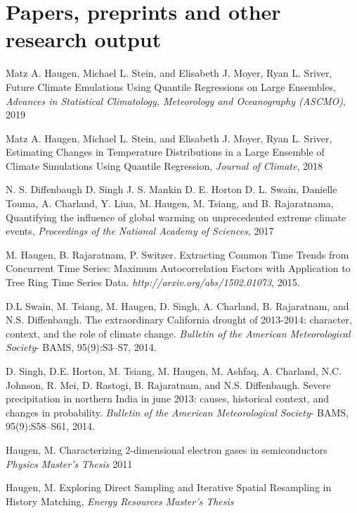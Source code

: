 \documentclass[letterpaper, 12pt]{article}
\renewenvironment{itemize}{
  \begin{list}{}{
    \setlength{\leftmargin}{1.5em}
  }
}{
  \end{list}
}
\begin{document}
\section*{Papers, preprints and other research output}
\begin{itemize}
  \item{Matz A. Haugen, Michael L. Stein, and Elisabeth J. Moyer, Ryan L. Sriver, Future Climate Emulations Using Quantile Regressions on Large Ensembles, \emph{Advances in Statistical Climatology, Meteorology and Oceanography (ASCMO)}, 2019}
  \item{Matz A. Haugen, Michael L. Stein, and Elisabeth J. Moyer, Ryan L. Sriver, Estimating Changes in Temperature Distributions in a Large Ensemble of Climate Simulations Using Quantile Regression, \emph{Journal of Climate}, 2018}
  \item N. S. Diffenbaugh D. Singh J. S. Mankin D. E. Horton D. L. Swain, Danielle Touma, A. Charland, Y. Liua, M. Haugen, M. Tsiang, and B. Rajaratnama, Quantifying the influence of global warming on unprecedented extreme climate events, \emph{Proceedings of the National Academy of Sciences}, 2017
\item M. Haugen, B. Rajaratnam, P. Switzer. Extracting Common Time
  Trends from Concurrent Time Series: Maximum Autocorrelation Factors
  with Application to Tree Ring Time Series Data. \emph{http://arxiv.org/abs/1502.01073}, 2015.
\item D.L Swain, M. Tsiang, M. Haugen, D. Singh, A. Charland, B. Rajaratnam, and N.S. Diffenbaugh.
The extraordinary California drought of 2013-2014: character, context, and the role of climate
change. \emph{Bulletin of the American Meteorological Society}- BAMS,
95(9):S3--S7, 2014.
\item D. Singh, D.E. Horton, M. Tsiang, M. Haugen, M. Ashfaq, A. Charland, N.C. Johnson, R. Mei, D. Rastogi,  B. Rajaratnam, and N.S. Diffenbaugh. Severe precipitation in northern India in june
2013: causes, historical context, and changes in probability. \emph{Bulletin of the American Meteorological
Society}- BAMS, 95(9):S58--S61, 2014.
\item Haugen, M. Characterizing 2-dimensional electron gases in semiconductors \emph{Physics Master's Thesis} 2011
\item Haugen, M. Exploring Direct Sampling and Iterative Spatial
Resampling in History Matching, \emph{Energy Resources Master's Thesis}
\end{itemize}
\end{document}
